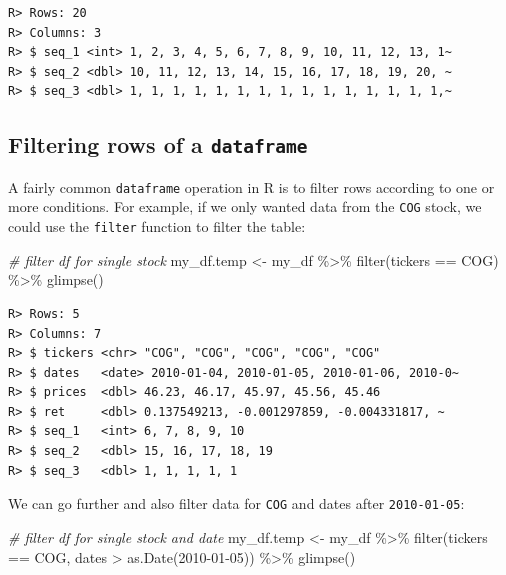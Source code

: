 \documentclass[
  12pt,
]{book}
\newenvironment{Shaded}{\begin{snugshade}}{\end{snugshade}}
\newcommand{\CommentTok}[1]{\textcolor[rgb]{0.37,0.37,0.37}{\textit{#1}}}
\newcommand{\FunctionTok}[1]{\textcolor[rgb]{0,0,0}{#1}}
\newcommand{\NormalTok}[1]{#1}
\newcommand{\OtherTok}[1]{\textcolor[rgb]{0.37,0.37,0.37}{#1}}
\newcommand{\SpecialCharTok}[1]{\textcolor[rgb]{0,0,0}{#1}}
\newcommand{\StringTok}[1]{\textcolor[rgb]{0.5,0.5,0.5}{#1}}
\begin{document}
\begin{verbatim}
R> Rows: 20
R> Columns: 3
R> $ seq_1 <int> 1, 2, 3, 4, 5, 6, 7, 8, 9, 10, 11, 12, 13, 1~
R> $ seq_2 <dbl> 10, 11, 12, 13, 14, 15, 16, 17, 18, 19, 20, ~
R> $ seq_3 <dbl> 1, 1, 1, 1, 1, 1, 1, 1, 1, 1, 1, 1, 1, 1, 1,~
\end{verbatim}

\hypertarget{filtering-rows-of-a-dataframe}{%
\subsection{\texorpdfstring{Filtering rows of a \texttt{dataframe}}{Filtering rows of a dataframe}}\label{filtering-rows-of-a-dataframe}}

A fairly common \texttt{dataframe} operation in R is to filter rows according to one or more conditions. For example, if we only wanted data from the \texttt{\textquotesingle{}COG\textquotesingle{}} stock, we could use the \texttt{filter} function to filter the table: 

\begin{Shaded}
\begin{Highlighting}[]
\CommentTok{\# filter df for single stock}
\NormalTok{my\_df.temp }\OtherTok{\textless{}{-}}\NormalTok{ my\_df }\SpecialCharTok{\%\textgreater{}\%}
  \FunctionTok{filter}\NormalTok{(tickers }\SpecialCharTok{==} \StringTok{\textquotesingle{}COG\textquotesingle{}}\NormalTok{) }\SpecialCharTok{\%\textgreater{}\%}
  \FunctionTok{glimpse}\NormalTok{()}
\end{Highlighting}
\end{Shaded}

\begin{verbatim}
R> Rows: 5
R> Columns: 7
R> $ tickers <chr> "COG", "COG", "COG", "COG", "COG"
R> $ dates   <date> 2010-01-04, 2010-01-05, 2010-01-06, 2010-0~
R> $ prices  <dbl> 46.23, 46.17, 45.97, 45.56, 45.46
R> $ ret     <dbl> 0.137549213, -0.001297859, -0.004331817, ~
R> $ seq_1   <int> 6, 7, 8, 9, 10
R> $ seq_2   <dbl> 15, 16, 17, 18, 19
R> $ seq_3   <dbl> 1, 1, 1, 1, 1
\end{verbatim}

We can go further and also filter data for \texttt{\textquotesingle{}COG\textquotesingle{}} and dates after \texttt{\textquotesingle{}2010-01-05\textquotesingle{}}:

\begin{Shaded}
\begin{Highlighting}[]
\CommentTok{\# filter df for single stock and date}
\NormalTok{my\_df.temp }\OtherTok{\textless{}{-}}\NormalTok{ my\_df }\SpecialCharTok{\%\textgreater{}\%}
  \FunctionTok{filter}\NormalTok{(tickers }\SpecialCharTok{==} \StringTok{\textquotesingle{}COG\textquotesingle{}}\NormalTok{,}
\NormalTok{         dates }\SpecialCharTok{\textgreater{}} \FunctionTok{as.Date}\NormalTok{(}\StringTok{\textquotesingle{}2010{-}01{-}05\textquotesingle{}}\NormalTok{)) }\SpecialCharTok{\%\textgreater{}\%}
  \FunctionTok{glimpse}\NormalTok{()}
\end{Highlighting}
\end{Shaded}
\end{document}
